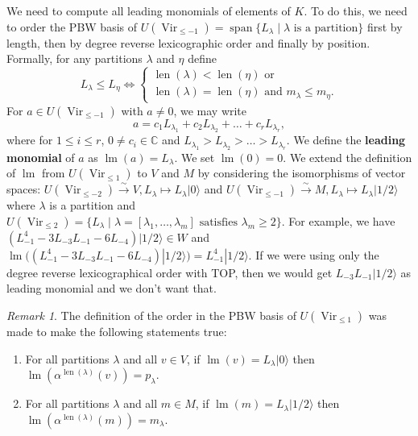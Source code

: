 \documentclass[12pt, a4paper]{article}
\theoremstyle{remark}
\newtheorem{remark}[theorem]{Remark}
\DeclareMathOperator{\Vir}{Vir}
\DeclareMathOperator{\lm}{lm}
\DeclareMathOperator{\vspan}{span}
\DeclareMathOperator{\len}{len}
\newcommand{\vac}{|0\rangle}
\newcommand{\vachalf}{|1/2\rangle}
\begin{document}
We need to compute all leading monomials of elements of $K$.
To do this, we need to order the PBW basis of $U(\Vir_{\le -1})=\vspan\{L_\lambda\mid \lambda\text{ is a partition}\}$ first by length, then by degree reverse lexicographic order and finally by position.
Formally, for any partitions $\lambda$ and $\eta$ define
\begin{equation*}
  L_\lambda \le L_\eta \iff
  \begin{cases}
    \len(\lambda) < \len(\eta)\text{ or } \\
    \len(\lambda) = \len(\eta)\text{ and }m_\lambda \le m_\eta.
  \end{cases}
\end{equation*}
For $a \in U(\Vir_{\le -1})$ with $a \neq 0$, we may write
\begin{equation*}
  a = c_1L_{\lambda_1} + c_2L_{\lambda_2} + \dots + c_rL_{\lambda_r},
\end{equation*}
where for $1 \le i\le r$, $0 \neq c_i \in \mathbb{C}$ and $L_{\lambda_1} > L_{\lambda_2} > \dots > L_{\lambda_r}$.
We define the \textbf{leading monomial} of $a$ as $\lm(a) = L_\lambda$. 
We set $\lm(0) = 0$.
We extend the definition of $\lm$ from $U(\Vir_{\le 1})$ to $V$ and $M$ by considering the isomorphisms of vector spaces: $U(\Vir_{\le -2}) \xrightarrow{\sim} V, L_\lambda \mapsto L_\lambda\vac$ and $U(\Vir_{\le -1}) \xrightarrow{\sim} M, L_\lambda \mapsto L_\lambda\vachalf$ where $\lambda$ is a partition and $U(\Vir_{\le 2}) = \{L_\lambda \mid \lambda = [\lambda_1, \dots, \lambda_m]\text{ satisfies } \lambda_m \ge 2\}$.
For example, we have $(L_{-1}^4 - 3L_{-3}L_{-1} - 6L_{-4})\vachalf \in W$ and $\lm((L_{-1}^4 - 3L_{-3}L_{-1} - 6L_{-4})\vachalf) = L_{-1}^4\vachalf$.
If we were using only the degree reverse lexicographical order with TOP, then we would get $L_{-3}L_{-1}\vachalf$ as leading monomial and we don't want that.

\begin{remark}
  \label{rmk:1}
  The definition of the order in the PBW basis of $U(\Vir_{\le 1})$ was made to make the following statements true:
  \begin{enumerate}[label={(\alph*)}]
  \item For all partitions $\lambda$ and all $v \in V$, if $\lm(v) = L_\lambda\vac$ then $\lm(\alpha^{\len(\lambda)}(v)) = p_\lambda$.
  \item For all partitions $\lambda$ and all $m \in M$, if $\lm(m) = L_\lambda\vachalf$ then $\lm(\alpha^{\len(\lambda)}(m)) = m_\lambda$.
  \end{enumerate}
\end{remark}
\end{document}

